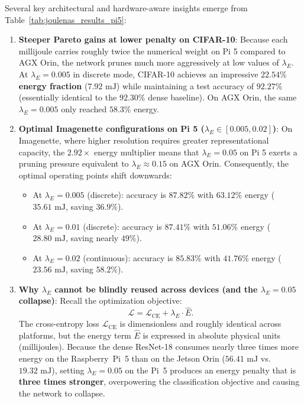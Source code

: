 Several key architectural and hardware-aware insights emerge from Table~\ref{tab:joulenas_results_pi5}:

\begin{enumerate}
    \item \textbf{Steeper Pareto gains at lower penalty on CIFAR-10}:
    Because each millijoule carries roughly twice the numerical weight on Pi 5 compared to AGX Orin, the network prunes much more aggressively at low values of $\lambda_E$. At $\lambda_E = 0.005$ in discrete mode, CIFAR-10 achieves an impressive \textbf{$22.54\%$ energy fraction} ($7.92\text{ mJ}$) while maintaining a test accuracy of \textbf{$92.27\%$} (essentially identical to the $92.30\%$ dense baseline). On AGX Orin, the same $\lambda_E = 0.005$ only reached $58.3\%$ energy.

    \item \textbf{Optimal Imagenette configurations on Pi 5 ($\lambda_E \in [0.005, 0.02]$)}:
    On Imagenette, where higher resolution requires greater representational capacity, the $2.92\times$ energy multiplier means that $\lambda_E = 0.05$ on Pi 5 exerts a pruning pressure equivalent to $\lambda_E \approx 0.15$ on AGX Orin.
    Consequently, the optimal operating points shift downwards:
    \begin{itemize}
        \item At $\lambda_E = 0.005$ (discrete): accuracy is \textbf{$87.82\%$} with $63.12\%$ energy ($35.61\text{ mJ}$, saving $36.9\%$).
        \item At $\lambda_E = 0.01$ (discrete): accuracy is \textbf{$87.41\%$} with $51.06\%$ energy ($28.80\text{ mJ}$, saving nearly $49\%$).
        \item At $\lambda_E = 0.02$ (continuous): accuracy is \textbf{$85.83\%$} with $41.76\%$ energy ($23.56\text{ mJ}$, saving $58.2\%$).
    \end{itemize}

    \item \textbf{Why $\lambda_E$ cannot be blindly reused across devices (and the $\lambda_E = 0.05$ collapse)}:
    Recall the optimization objective:
    \begin{equation}
    \mathcal{L} = \mathcal{L}_{\text{CE}} + \lambda_E \cdot \widehat{E}.
    \end{equation}
    The cross-entropy loss $\mathcal{L}_{\text{CE}}$ is dimensionless and roughly identical across platforms, but the energy term $\widehat{E}$ is expressed in absolute physical units (millijoules). Because the dense ResNet-18 consumes nearly three times more energy on the Raspberry~Pi~5 than on the Jetson Orin ($56.41\text{ mJ}$ vs. $19.32\text{ mJ}$), setting $\lambda_E = 0.05$ on the Pi~5 produces an energy penalty that is \textbf{three times stronger}, overpowering the classification objective and causing the network to collapse.


\end{enumerate}
